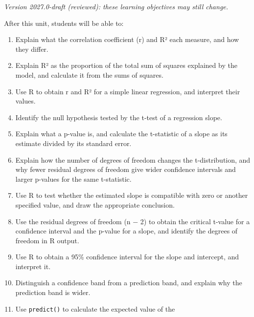 \documentclass[
  letterpaper,
  8pt,
  a4paper]{book}
\providecommand{\tightlist}{%
  \setlength{\itemsep}{0pt}\setlength{\parskip}{0pt}}
\begin{document}
\begin{tcolorbox}[enhanced jigsaw, arc=.35mm, bottomrule=.15mm, bottomtitle=1mm, breakable, colback=white, colbacktitle=quarto-callout-note-color!10!white, colframe=quarto-callout-note-color-frame, coltitle=black, left=2mm, leftrule=.75mm, opacityback=0, opacitybacktitle=0.6, rightrule=.15mm, title=\textcolor{quarto-callout-note-color}{\faInfo}\hspace{0.5em}{Learning objectives}, titlerule=0mm, toprule=.15mm, toptitle=1mm]

\emph{Version 2027.0-draft (reviewed): these learning objectives may
still change.}

After this unit, students will be able to:

\begin{enumerate}
\def\labelenumi{\arabic{enumi}.}
\tightlist
\item
  Explain what the correlation coefficient (r) and R² each measure, and
  how they differ.
\item
  Explain R² as the proportion of the total sum of squares explained by
  the model, and calculate it from the sums of squares.
\item
  Use R to obtain r and R² for a simple linear regression, and interpret
  their values.
\item
  Identify the null hypothesis tested by the t-test of a regression
  slope.
\item
  Explain what a p-value is, and calculate the t-statistic of a slope as
  its estimate divided by its standard error.
\item
  Explain how the number of degrees of freedom changes the
  t-distribution, and why fewer residual degrees of freedom give wider
  confidence intervals and larger p-values for the same t-statistic.
\item
  Use R to test whether the estimated slope is compatible with zero or
  another specified value, and draw the appropriate conclusion.
\item
  Use the residual degrees of freedom (n − 2) to obtain the critical
  t-value for a confidence interval and the p-value for a slope, and
  identify the degrees of freedom in R output.
\item
  Use R to obtain a 95\% confidence interval for the slope and
  intercept, and interpret it.
\item
  Distinguish a confidence band from a prediction band, and explain why
  the prediction band is wider.
\item
  Use \texttt{predict()} to calculate the expected value of the

\end{enumerate}
\end{tcolorbox}
\end{document}
